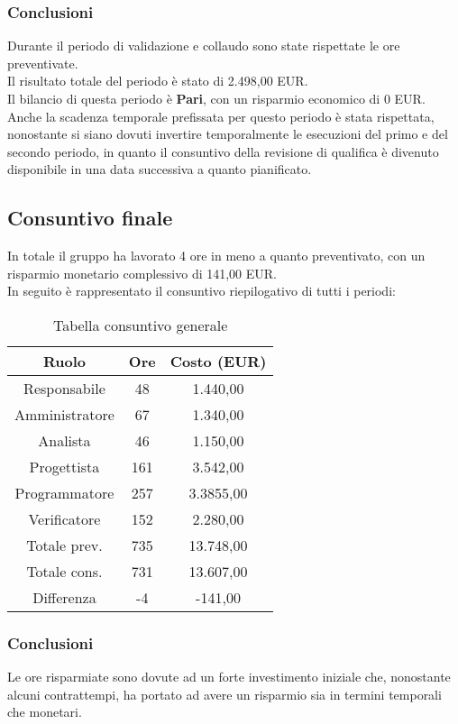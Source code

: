 \subsubsection{Conclusioni}
Durante il periodo di validazione e collaudo sono state rispettate le ore preventivate.\\
Il risultato totale del periodo è stato di 2.498,00 EUR.
\\Il bilancio di questa periodo è \textbf{Pari}, con un risparmio economico di 0 EUR. Anche la scadenza temporale prefissata per questo periodo è stata rispettata, nonostante si siano dovuti invertire temporalmente le esecuzioni del primo e del secondo periodo, in quanto il consuntivo della revisione di qualifica è divenuto disponibile in una data successiva a quanto pianificato.

\subsection{Consuntivo finale}
In totale il gruppo ha lavorato 4 ore in meno a quanto preventivato, con un risparmio monetario complessivo di 141,00 EUR. \\
In seguito è rappresentato il consuntivo riepilogativo di tutti i periodi:
\begin{table}[h]
	\caption{Tabella consuntivo generale}  
	\begin{center}
		\begin{tabular}{ |c|c|c|  }
			\hline
			Ruolo 			& Ore 	& Costo (EUR)\\
			\hline\hline
			Responsabile	& 48	& 1.440,00\\
			Amministratore	& 67	& 1.340,00\\
			Analista		& 46	& 1.150,00\\
			Progettista		& 161	& 3.542,00\\
			Programmatore	& 257	& 3.3855,00\\
			Verificatore	& 152	& 2.280,00\\
			\hline\hline
			Totale prev.	& 735	& 13.748,00 \\
			Totale cons.	& 731	& 13.607,00 \\
			Differenza		& -4	& -141,00 \\
			\hline
		\end{tabular}
	\end{center}
\end{table}

\newpage
\subsubsection{Conclusioni}
Le ore risparmiate sono dovute ad un forte investimento iniziale che, nonostante alcuni contrattempi, ha portato ad avere un risparmio sia in termini temporali che monetari.

